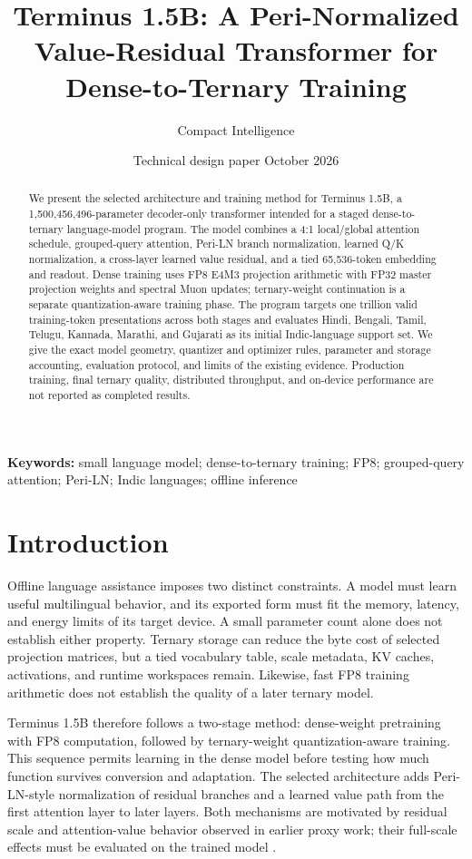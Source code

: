 \documentclass[11pt]{article}
\title{\vspace{-1.0cm}\textbf{Terminus 1.5B: A Peri-Normalized Value-Residual Transformer for Dense-to-Ternary Training}}
\author{Compact Intelligence}
\date{Technical design paper \quad 14 October 2026}
\newcommand{\model}{Terminus 1.5B}
\newcommand{\QAT}{quantization-aware training}
\begin{document}
\maketitle

\begin{abstract}
We present the selected architecture and training method for \model{}, a
1,500,456,496-parameter decoder-only transformer intended for a staged
dense-to-ternary language-model program. The model combines a 4:1 local/global
attention schedule, grouped-query attention, Peri-LN branch normalization,
learned Q/K normalization, a cross-layer learned value residual, and a tied
65,536-token embedding and readout. Dense training uses FP8 E4M3 projection
arithmetic with FP32 master projection weights and spectral Muon updates;
ternary-weight continuation is a separate \QAT{} phase. The program targets
one trillion valid training-token presentations across both stages and
evaluates Hindi, Bengali, Tamil, Telugu, Kannada, Marathi, and Gujarati as its
initial Indic-language support set. We give the exact model geometry,
quantizer and optimizer rules, parameter and storage accounting, evaluation
protocol, and limits of the existing evidence. Production training, final
ternary quality, distributed throughput, and on-device performance are not
reported as completed results.
\end{abstract}

\noindent\textbf{Keywords:} small language model; dense-to-ternary training;
FP8; grouped-query attention; Peri-LN; Indic languages; offline inference

\section{Introduction}

Offline language assistance imposes two distinct constraints. A model must
learn useful multilingual behavior, and its exported form must fit the memory,
latency, and energy limits of its target device. A small parameter count alone
does not establish either property. Ternary storage can reduce the byte cost
of selected projection matrices, but a tied vocabulary table, scale metadata,
KV caches, activations, and runtime workspaces remain. Likewise, fast FP8
training arithmetic does not establish the quality of a later ternary model.

\model{} therefore follows a two-stage method: dense-weight pretraining with
FP8 computation, followed by ternary-weight \QAT{}. This sequence permits
learning in the dense model before testing how much function survives
conversion and adaptation. The selected architecture adds Peri-LN-style
normalization of residual branches and a learned value path from the first
attention layer to later layers. Both mechanisms are motivated by residual
scale and attention-value behavior observed in earlier proxy work; their
full-scale effects must be evaluated on the trained model
\cite{peri,valueresidual}.
\end{document}
